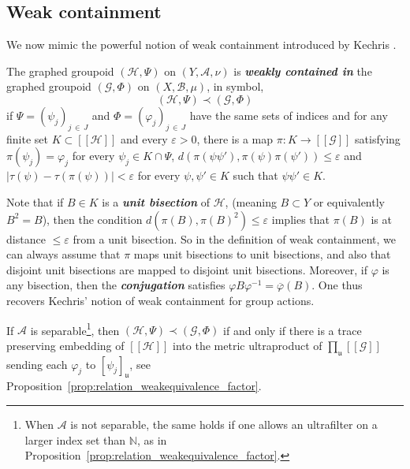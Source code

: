 \documentclass[AHL,Unicode,longabstracts,published]{cedram}
\newcommand{\defin}[1]{\textbf{\emph{#1}}}
\newcommand{\Nmath}{\mathbb{N}}
\newcommand{\cH}{\mathcal{H}}
\newcommand{\ch}{\mathcal{H}}
\newcommand{\cg}{\mathcal{G}}
\newcommand{\ra}{\mathscr{A}}
\newcommand{\rb}{\mathscr{B}}
\newcommand{\ul}{\mathfrak{u}}
\newcommand{\eps}{\varepsilon}
\newcommand{\ph}{\varphi}
\newcommand*{\MK}{\mkern 2mu}
\begin{document}
\subsection{Weak containment}
We now mimic the powerful notion of weak containment introduced by Kechris \cite[Section~10$\MK$(C)]{Kechris-Global-aspects-2010}.

\begin{defi}
The graphed groupoid $(\ch,\Psi)$ on $(Y,\ra, \nu)$ is
\defin{weakly contained in} the graphed groupoid $(\cg, \Phi)$ on $(X, \rb, \mu)$, in symbol,
\[
(\ch,\Psi) \prec (\cg, \Phi)
\]
if $\Psi=(\psi_j)_{j\,\in\,J}$ and $\Phi=(\ph_j)_{j\,\in\,J}$ have the same sets of indices and for any finite set $K \subset [[\cH]]$ and every $\eps>0$, there is a map $\pi \colon K \to [[\cg]]$ satisfying $\pi(\psi_j) = \ph_j$ for every $\psi_j \in K \cap \Psi$, $d(\pi(\psi\psi'),\pi(\psi)\pi(\psi')) \leq \eps$ and $|\tau(\psi) - \tau(\pi(\psi))|<\eps$ for every $\psi,\psi' \in K$ such that $\psi\psi' \in K$.
\end{defi}

Note that if $B \in K$ is a \defin{unit bisection} of $\ch$, (meaning $B \subset Y$ or equivalently $B^2=B$), then the condition $d(\pi(B),\pi(B)^2) \leq \eps$ implies that $\pi(B)$ is at distance $\leq \eps$ from a unit bisection. So in the definition of weak containment, we can always assume that $\pi$ maps unit bisections to unit bisections, and also that disjoint unit bisections are mapped to disjoint unit bisections. Moreover, if $\ph$ is any bisection, then the
\defin{conjugation} satisfies $\ph B \ph^{-1}=\overline{\ph}(B)$. One thus recovers Kechris' notion of weak containment for group actions.

If $\ra$ is separable\footnote{When $\ra$ is not separable, the same holds if one allows an ultrafilter on a larger index set than $\Nmath$, as in Proposition~\ref{prop:relation_weakequivalence_factor}.}, then $(\ch,\Psi) \prec (\cg, \Phi)$ if and only if there is a trace preserving embedding of $[[\ch]]$ into the metric ultraproduct of $\prod_\ul [[\cg]]$ sending each $\ph_j$ to $[\psi_j]_\ul$, see Proposition~\ref{prop:relation_weakequivalence_factor}.
\end{document}
